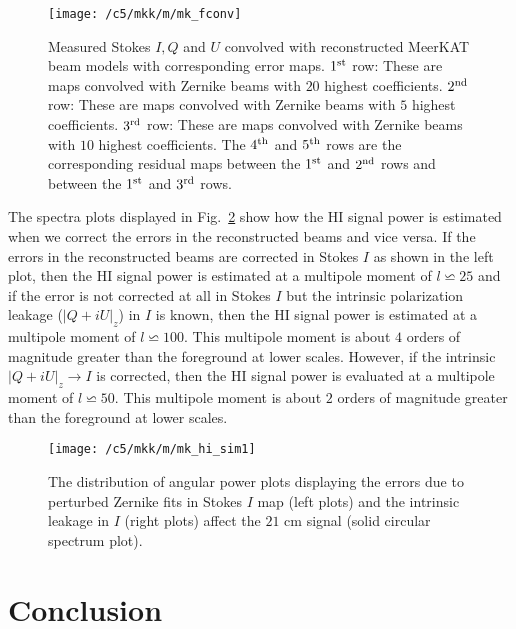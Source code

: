  \begin{figure}
 \begin{minipage}[H]{\linewidth}
      \centering      
      \texttt{[image: /c5/mkk/m/mk\_fconv]}     
     \caption{ \label{fig:mz}  Measured Stokes $I, Q$ and $U$ convolved with reconstructed MeerKAT beam models with corresponding error maps. $1^{\rm st}$ row: These are maps convolved with Zernike beams with $20$ highest coefficients.
     $2^{\rm nd}$ row: These are maps convolved with Zernike beams with $5$ highest coefficients.
     $3^{\rm rd}$ row: These are maps convolved with Zernike beams with $10$ highest coefficients. The $4^{\rm th}$ and  $5^{\rm th}$ rows are the corresponding residual maps between the $1^{\rm st}$ and  $2^{\rm nd}$ rows and between the $1^{\rm st}$ and  $3^{\rm rd}$ rows.} 	   
	 \end{minipage}
    \end{figure}


 The spectra plots displayed in Fig.~\ref{fig:hI} show how the HI signal power is estimated when we correct the errors in the reconstructed beams and vice versa. If the errors in the reconstructed beams are corrected in Stokes $I$ 
as shown in the left plot, then the HI signal power is estimated at a multipole moment of $l \backsimeq 25$ and if the error is not corrected at all 
in Stokes $I$ but the intrinsic polarization leakage ($|Q + iU|_z$) in $I$ is known, then the HI signal power is estimated at a multipole moment of $l \backsimeq 100$. This multipole moment is about $4$ orders of magnitude greater than the foreground at lower scales. However, if the intrinsic  $|Q + iU|_{z} \longrightarrow I$ is corrected, then the HI signal power is evaluated at a multipole moment of $l \backsimeq 50$. This multipole moment is about $2$ orders of magnitude greater than the foreground at lower scales.

\begin{figure}
 \begin{minipage}[H]{\linewidth}
      \centering      
      \texttt{[image: /c5/mkk/m/mk\_hi\_sim1]}     
     \caption{ \label{fig:hI}    The distribution of angular power plots displaying the errors due to perturbed Zernike fits in Stokes $I$ map (left plots) and 
     the intrinsic leakage in $I$ (right plots) affect the $21$ cm signal (solid circular spectrum plot).}
     \end{minipage}	    
    \end{figure}

\section{Conclusion}	   \label{chap5:concs}
% 

